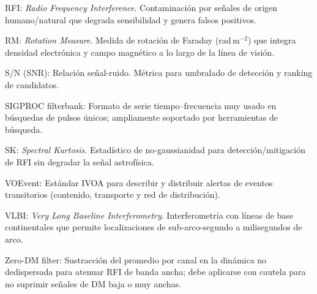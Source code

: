 {RFI: \textit{Radio Frequency Interference}. Contaminación por señales de origen humano/natural que degrada sensibilidad y genera falsos positivos.

RM: \textit{Rotation Measure}. Medida de rotación de Faraday (rad\,m$^{-2}$) que integra densidad electrónica y campo magnético a lo largo de la línea de visión. \citep{Petroff_2022}

S/N (SNR): Relación señal-ruido. Métrica para umbralado de detección y ranking de candidatos.

SIGPROC filterbank: Formato de serie tiempo–frecuencia muy usado en búsquedas de pulsos únicos; ampliamente soportado por herramientas de búsqueda. \citep{Heimdall_Use}

SK: \textit{Spectral Kurtosis}. Estadístico de no-gaussianidad para detección/mitigación de RFI sin degradar la señal astrofísica. \citep{Nita_2010_SK}

VOEvent: Estándar IVOA para describir y distribuir alertas de eventos transitorios (contenido, transporte y red de distribución). \citep{VOEvent_2_0,VOEvent_Transport}

VLBI: \textit{Very Long Baseline Interferometry}. Interferometría con líneas de base continentales que permite localizaciones de sub-arco-segundo a milisegundos de arco.

Zero-DM filter: Sustracción del promedio por canal en la dinámica no dedispersada para atenuar RFI de banda ancha; debe aplicarse con cautela para no suprimir señales de DM baja o muy anchas. \citep{Rajwade_2024_Review}

}
